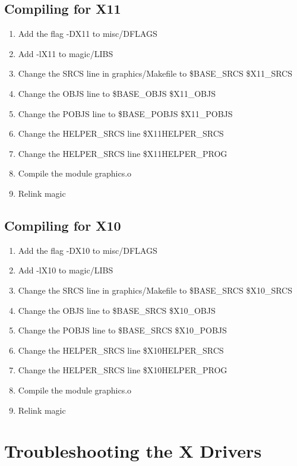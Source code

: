 \documentclass[letterpaper,twoside,12pt]{article}
\begin{document}
\subsection{Compiling for X11}

\begin{enumerate}
\item Add the flag -DX11 to misc/DFLAGS
\item Add -lX11 to magic/LIBS
\item Change the SRCS line in graphics/Makefile to  \${BASE{\_}SRCS} \${X11{\_}SRCS}
\item Change the OBJS line to  \${BASE{\_}OBJS} \${X11{\_}OBJS}
\item Change the POBJS line to  \${BASE{\_}POBJS} \${X11{\_}POBJS}
\item Change the HELPER{\_}SRCS line  \${X11HELPER{\_}SRCS}
\item Change the HELPER{\_}SRCS line  \${X11HELPER{\_}PROG}
\item Compile the module graphics.o
\item Relink magic
\end{enumerate}

\subsection{Compiling for X10}

\begin{enumerate}
\item Add the flag -DX10 to misc/DFLAGS
\item Add -lX10 to magic/LIBS
\item Change the SRCS line in graphics/Makefile to  \${BASE{\_}SRCS} \${X10{\_}SRCS} 
\item Change the OBJS line to  \${BASE{\_}SRCS} \${X10{\_}OBJS}
\item Change the POBJS line to  \${BASE{\_}SRCS} \${X10{\_}POBJS}
\item Change the HELPER{\_}SRCS line  \${X10HELPER{\_}SRCS}
\item Change the HELPER{\_}SRCS line  \${X10HELPER{\_}PROG}
\item Compile the module graphics.o
\item Relink magic
\end{enumerate}

\section{Troubleshooting the X Drivers}
\end{document}
